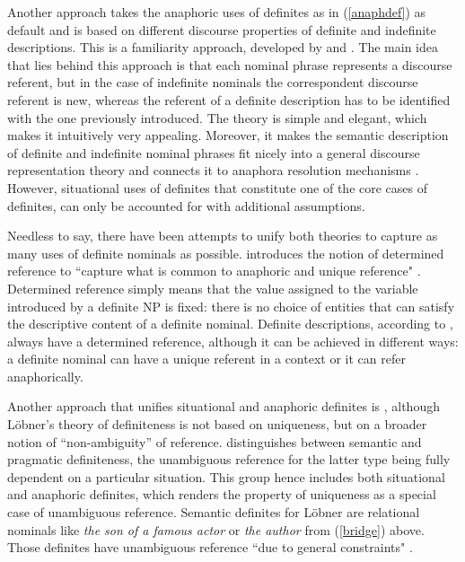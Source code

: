 \documentclass[output=paper,colorlinks,citecolor=brown]{langscibook}
\begin{document}
Another approach takes the anaphoric uses of definites as in (\ref{anaphdef}) as default and is based on different discourse properties of definite and indefinite descriptions. This is a familiarity approach, developed by \citet{kamp81} and \citet{Heim1982}. The main idea that lies behind this approach is that each nominal phrase represents a discourse referent, but in the case of indefinite nominals the correspondent discourse referent is new, whereas the referent of a definite description has to be identified with the one previously introduced. The theory is simple and elegant, which makes it intuitively very appealing. Moreover, it makes the semantic description of definite and indefinite nominal phrases fit nicely into a general discourse representation theory and connects it to anaphora resolution mechanisms \citep[][]{Kamp1993}. However, situational uses of definites that constitute one of the core cases of definites, can only be accounted for with additional assumptions. 

Needless to say, there have been attempts to unify both theories to capture as many uses of definite nominals as possible. \citet{Farkas2002} introduces the notion of determined reference to ``capture what is common to anaphoric and unique reference" \citep[221]{Farkas2002}. Determined reference simply means that the value assigned to the variable introduced by a definite NP is fixed: there is no choice of entities that can satisfy the descriptive content of a definite nominal. Definite descriptions, according to \citet{Farkas2002}, always have a determined reference, although it can be achieved in different ways: a definite nominal can have a unique referent in a context or it can refer anaphorically. 

Another approach that unifies situational and anaphoric definites is \citet{lobner85}, although L\"{o}bner's theory of definiteness is not based on uniqueness,
but on a broader notion of ``non-ambiguity'' of reference. \citet{lobner85} distinguishes between semantic and pragmatic definiteness, the unambiguous reference for the latter type being fully dependent on a particular situation. This group hence includes both situational and anaphoric definites, which renders the property of uniqueness as a special case of unambiguous reference. Semantic definites for L\"{o}bner are relational nominals like \textit{the son of a famous actor} or \textit{the author} from (\ref{bridge}) above. Those definites have unambiguous reference ``due to general constraints" \citep[see][229]{lobner85}.
\end{document}
